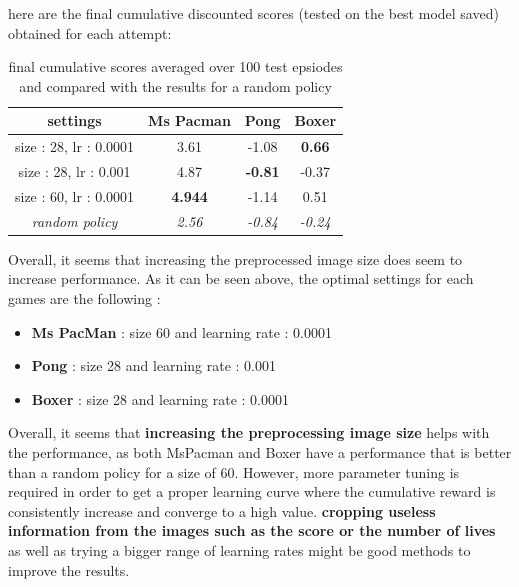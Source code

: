 \documentclass{report}
\begin{document}
here are the final cumulative discounted scores (tested on the best model saved) obtained for each attempt: \\

\begin{table}[H]
\centering
\label{b4Tab}
\begin{tabular}{|c|c|c|c|}
\hline
settings 				& Ms Pacman 		& Pong 				& Boxer 		  \\ \hline
size : 28, lr : 0.0001  & 3.61 				& -1.08 			& \textbf{0.66}   \\ \hline
size : 28, lr : 0.001  	& 4.87 				& \textbf{-0.81} 	& -0.37 		  \\ \hline
size : 60, lr : 0.0001  & \textbf{4.944} 	& -1.14 			& 0.51	 		  \\ \hline
\textit{random policy} 	& \textit{2.56} 	& \textit{-0.84}	& \textit{-0.24}  \\ \hline
\end{tabular}


\caption{final cumulative scores averaged over 100 test epsiodes and compared with the results for a random policy }
\end{table}

Overall, it seems that increasing the preprocessed image size does seem to increase performance. As it can be seen above, the optimal settings  for each games are the following : 

\begin{itemize}
	\item \textbf{Ms PacMan} : size 60 and learning rate : 0.0001
	\item \textbf{Pong} : size 28 and learning rate : 0.001
	\item \textbf{Boxer} : size 28 and learning rate : 0.0001
\end{itemize}

Overall, it seems that \textbf{increasing the preprocessing image size} helps with the performance, as both MsPacman and Boxer have a performance that is better than a random policy for a size of 60. However, more parameter tuning is required in order to get a proper learning curve where the cumulative reward is consistently increase and converge to a high value. \textbf{cropping useless information from the images such as the score or the number of lives} as well as trying a bigger range of learning rates might be good methods to improve the results.
\end{document}
